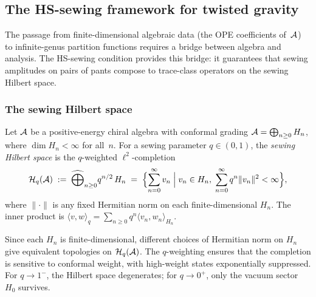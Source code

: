 
\subsection{The HS-sewing framework for twisted gravity}
\label{subsec:thqg-I-hs-sewing-framework}

The passage from finite-dimensional algebraic data (the OPE coefficients of~$\mathcal{A}$) to infinite-genus partition functions requires a bridge between algebra and analysis. The HS-sewing condition provides this bridge: it guarantees that sewing amplitudes on pairs of pants compose to trace-class operators on the sewing Hilbert space.

\subsubsection{The sewing Hilbert space}

\begin{definition}
Let $\mathcal{A}$ be a positive-energy chiral algebra with conformal grading $\mathcal{A} = \bigoplus_{n \geq 0} H_n$, where $\dim H_n < \infty$ for all~$n$. For a sewing parameter $q \in (0,1)$, the \emph{sewing Hilbert space} is the $q$-weighted $\ell^2$-completion
\begin{equation}%
\mathcal{H}_q(\cA) \;:=\; \widehat{\bigoplus}_{n \geq 0} q^{n/2}\,H_n \;=\; \Bigl\{ \sum_{n=0}^\infty v_n \;\Big|\; v_n \in H_n,\; \sum_{n=0}^\infty q^n \|v_n\|^2 < \infty \Bigr\},
\end{equation}
where $\|\cdot\|$ is any fixed Hermitian norm on each finite-dimensional $H_n$. The inner product is $\langle v, w \rangle_q = \sum_{n \geq 0} q^n \langle v_n, w_n \rangle_{H_n}$.
\end{definition}

\begin{remark}
Since each $H_n$ is finite-dimensional, different choices of Hermitian norm on $H_n$ give equivalent topologies on $\mathcal{H}_q(\mathcal{A})$. The $q$-weighting ensures that the completion is sensitive to conformal weight, with high-weight states exponentially suppressed. For $q \to 1^-$, the Hilbert space degenerates; for $q \to 0^+$, only the vacuum sector $H_0$ survives.
\end{remark}

